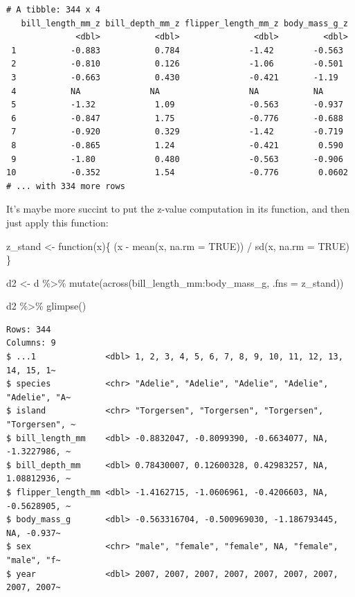 \documentclass[
  letterpaper,
  DIV=11,
  numbers=noendperiod]{scrreprt}
\newenvironment{Shaded}{\begin{snugshade}}{\end{snugshade}}
\newcommand{\AttributeTok}[1]{\textcolor[rgb]{0.40,0.45,0.13}{#1}}
\newcommand{\ConstantTok}[1]{\textcolor[rgb]{0.56,0.35,0.01}{#1}}
\newcommand{\ControlFlowTok}[1]{\textcolor[rgb]{0.00,0.23,0.31}{#1}}
\newcommand{\FunctionTok}[1]{\textcolor[rgb]{0.28,0.35,0.67}{#1}}
\newcommand{\NormalTok}[1]{\textcolor[rgb]{0.00,0.23,0.31}{#1}}
\newcommand{\OtherTok}[1]{\textcolor[rgb]{0.00,0.23,0.31}{#1}}
\newcommand{\SpecialCharTok}[1]{\textcolor[rgb]{0.37,0.37,0.37}{#1}}
\theoremstyle{definition}
\theoremstyle{definition}
\theoremstyle{remark}
\begin{document}
\begin{verbatim}
# A tibble: 344 x 4
   bill_length_mm_z bill_depth_mm_z flipper_length_mm_z body_mass_g_z
              <dbl>           <dbl>               <dbl>         <dbl>
 1           -0.883           0.784              -1.42        -0.563 
 2           -0.810           0.126              -1.06        -0.501 
 3           -0.663           0.430              -0.421       -1.19  
 4           NA              NA                  NA           NA     
 5           -1.32            1.09               -0.563       -0.937 
 6           -0.847           1.75               -0.776       -0.688 
 7           -0.920           0.329              -1.42        -0.719 
 8           -0.865           1.24               -0.421        0.590 
 9           -1.80            0.480              -0.563       -0.906 
10           -0.352           1.54               -0.776        0.0602
# ... with 334 more rows
\end{verbatim}

It's maybe more succint to put the z-value computation in its function,
and then just apply this function:

\begin{Shaded}
\begin{Highlighting}[]
\NormalTok{z\_stand }\OtherTok{\textless{}{-}} \ControlFlowTok{function}\NormalTok{(x)\{}
\NormalTok{  (x }\SpecialCharTok{{-}} \FunctionTok{mean}\NormalTok{(x, }\AttributeTok{na.rm =} \ConstantTok{TRUE}\NormalTok{)) }\SpecialCharTok{/} \FunctionTok{sd}\NormalTok{(x, }\AttributeTok{na.rm =} \ConstantTok{TRUE}\NormalTok{)}
\NormalTok{\}}
\end{Highlighting}
\end{Shaded}

\begin{Shaded}
\begin{Highlighting}[]
\NormalTok{d2 }\OtherTok{\textless{}{-}}
\NormalTok{d }\SpecialCharTok{\%\textgreater{}\%} 
  \FunctionTok{mutate}\NormalTok{(}\FunctionTok{across}\NormalTok{(bill\_length\_mm}\SpecialCharTok{:}\NormalTok{body\_mass\_g, }
                \AttributeTok{.fns =}\NormalTok{ z\_stand))}
  
\NormalTok{d2 }\SpecialCharTok{\%\textgreater{}\%} 
  \FunctionTok{glimpse}\NormalTok{()}
\end{Highlighting}
\end{Shaded}

\begin{verbatim}
Rows: 344
Columns: 9
$ ...1              <dbl> 1, 2, 3, 4, 5, 6, 7, 8, 9, 10, 11, 12, 13, 14, 15, 1~
$ species           <chr> "Adelie", "Adelie", "Adelie", "Adelie", "Adelie", "A~
$ island            <chr> "Torgersen", "Torgersen", "Torgersen", "Torgersen", ~
$ bill_length_mm    <dbl> -0.8832047, -0.8099390, -0.6634077, NA, -1.3227986, ~
$ bill_depth_mm     <dbl> 0.78430007, 0.12600328, 0.42983257, NA, 1.08812936, ~
$ flipper_length_mm <dbl> -1.4162715, -1.0606961, -0.4206603, NA, -0.5628905, ~
$ body_mass_g       <dbl> -0.563316704, -0.500969030, -1.186793445, NA, -0.937~
$ sex               <chr> "male", "female", "female", NA, "female", "male", "f~
$ year              <dbl> 2007, 2007, 2007, 2007, 2007, 2007, 2007, 2007, 2007~
\end{verbatim}
\end{document}
